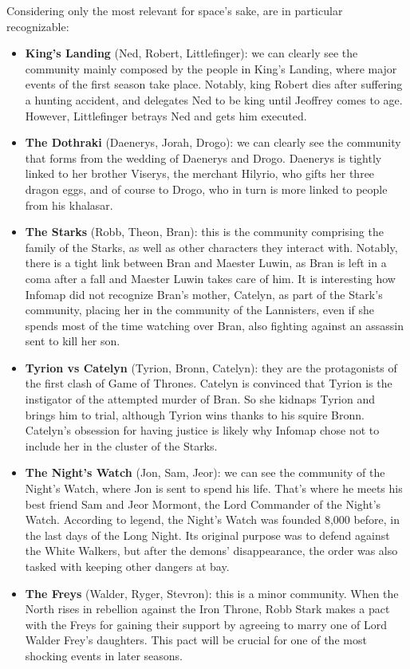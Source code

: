 \documentclass[10pt,twocolumn,letterpaper]{article}
\begin{document}
Considering only the most relevant for space's sake, are in particular recognizable:

\begin{itemize}
    \item \textbf{King's Landing} (Ned, Robert, Littlefinger): we can clearly see the community mainly composed by the people in King's Landing, where major events of the first season take place. Notably, king Robert dies after suffering a hunting accident, and delegates Ned to be king until Jeoffrey comes to age. However, Littlefinger betrays Ned and gets him executed. 
    \item \textbf{The Dothraki} (Daenerys, Jorah, Drogo): we can clearly see the community that forms from the wedding of Daenerys and Drogo. Daenerys is tightly linked to her brother Viserys, the merchant Hilyrio, who gifts her three dragon eggs, and of course to Drogo, who in turn is more linked to people from his khalasar.
    \item \textbf{The Starks} (Robb, Theon, Bran): this is the community comprising the family of the Starks, as well as other characters they interact with. Notably, there is a tight link between Bran and Maester Luwin, as Bran is left in a coma after a fall and Maester Luwin takes care of him. It is interesting how Infomap did not recognize Bran's mother, Catelyn, as part of the Stark's community, placing her in the community of the Lannisters, even if she spends most of the time watching over Bran, also fighting against an assassin sent to kill her son.
    \item \textbf{Tyrion vs Catelyn} (Tyrion, Bronn, Catelyn): they are the protagonists of the first clash of Game of Thrones. Catelyn is convinced that Tyrion is the instigator of the attempted murder of Bran. So she kidnaps Tyrion and brings him to trial, although Tyrion wins thanks to his squire Bronn. Catelyn's obsession for having justice is likely why Infomap chose not to include her in the cluster of the Starks. 
    \item \textbf{The Night's Watch} (Jon, Sam, Jeor): we can see the community of the Night's Watch, where Jon is sent to spend his life. That's where he meets his best friend Sam and Jeor Mormont, the Lord Commander of the Night's Watch. According to legend, the Night's Watch was founded 8,000 before, in the last days of the Long Night. Its original purpose was to defend against the White Walkers, but after the demons' disappearance, the order was also tasked with keeping other dangers at bay.
    \item \textbf{The Freys} (Walder, Ryger, Stevron): this is a minor community. When the North rises in rebellion against the Iron Throne, Robb Stark makes a pact with the Freys for gaining their support by agreeing to marry one of Lord Walder Frey's daughters. This pact will be crucial for one of the most shocking events in later seasons.

\end{itemize}
\end{document}
